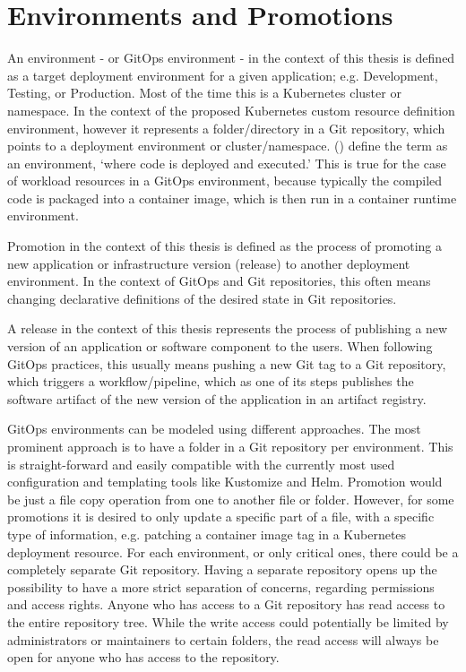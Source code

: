 \section{Environments and Promotions}

An environment
- or GitOps environment -
in the context of this thesis
is defined as a target deployment environment for a given application;
e.g. Development, Testing, or Production.
Most of the time this is a Kubernetes cluster or namespace.
In the context of the proposed Kubernetes custom resource definition
environment, however it represents a folder/directory in a Git repository,
which points to a deployment environment or cluster/namespace.
%
\citeauthor{gitopsAndKubernetes2021continuous} (\citeyear{gitopsAndKubernetes2021continuous})
define the term as an environment, \enquote*{where code is deployed and executed.}
\autocite{gitopsAndKubernetes2021continuous}
This is true for the case of workload resources in a GitOps environment,
because typically the compiled code is packaged into a container image,
which is then run in a container runtime environment.

Promotion in the context of this thesis is defined as
the process of promoting a new application or infrastructure version (release)
to another deployment environment.
In the context of GitOps and Git repositories,
this often means changing declarative definitions of the desired state in Git repositories.

A release in the context of this thesis
represents the process of
publishing a new version of an application or software component
to the users.
When following GitOps practices,
this usually means
pushing a new Git tag to a Git repository,
which triggers a workflow/pipeline,
which as one of its steps publishes the software artifact of
the new version of the application in an artifact registry.

GitOps environments can be modeled using different approaches.
The most prominent approach is to have a folder in a Git repository
per environment. This is straight-forward and easily compatible with
the currently most used configuration and templating tools like Kustomize and Helm.
Promotion would be just a file copy operation from one to another file or folder.
However, for some promotions it is desired to only update a specific part of a file,
with a specific type of information, e.g. patching a container image tag in a Kubernetes
deployment resource.
For each environment, or only critical ones, there could be a completely separate Git repository.
Having a separate repository opens up the possibility to have a more strict separation of concerns,
regarding permissions and access rights.
Anyone who has access to a Git repository has read access to the entire repository tree.
While the write access could potentially be limited by administrators or maintainers
to certain folders, the read access will always be open for anyone who has access to the repository.

